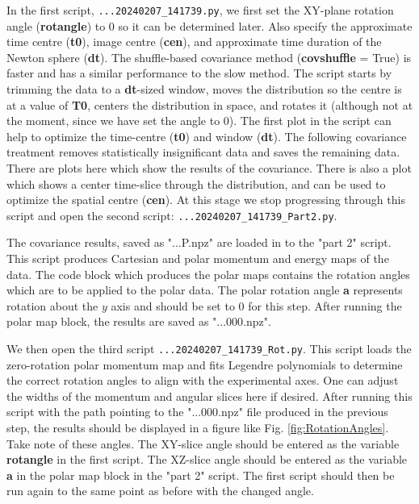 \documentclass[12pt]{article}
\begin{document}
In the first script, \texttt{...20240207\_141739.py}, we first set the XY-plane rotation angle (\textbf{rotangle}) to 0 so it can be determined later.
Also specify the approximate time centre (\textbf{t0}), image centre (\textbf{cen}), and approximate time duration of the Newton sphere (\textbf{dt}).
The shuffle-based covariance method (\textbf{covshuffle} = True) is faster and has a similar performance to the slow method.
The script starts by trimming the data to a \textbf{dt}-sized window, moves the distribution so the centre is at a value of \textbf{T0}, centers the distribution in space, and rotates it (although not at the moment, since we have set the angle to 0).
The first plot in the script can help to optimize the time-centre (\textbf{t0}) and window (\textbf{dt}).
The following covariance treatment removes statistically insignificant data and saves the remaining data.
There are plots here which show the results of the covariance.
There is also a plot which shows a center time-slice through the distribution, and can be used to optimize the spatial centre (\textbf{cen}).
At this stage we stop progressing through this script and open the second script: \texttt{...20240207\_141739\_Part2.py}.

The covariance results, saved as "...P.npz" are loaded in to the "part 2" script.
This script produces Cartesian and polar momentum and energy maps of the data.
The code block which produces the polar maps contains the rotation angles which are to be applied to the polar data.
The polar rotation angle \textbf{a} represents rotation about the $y$ axis and should be set to 0 for this step.
After running the polar map block, the results are saved as "...000.npz".

We then open the third script \texttt{...20240207\_141739\_Rot.py}.
This script loads the zero-rotation polar momentum map and fits Legendre polynomials to determine the correct rotation angles to align with the experimental axes.
One can adjust the widths of the momentum and angular slices here if desired.
After running this script with the path pointing to the "...000.npz" file produced in the previous step, the results should be displayed in a figure like Fig. \ref{fig:RotationAngles}.
Take note of these angles.
The XY-slice angle should be entered as the variable \textbf{rotangle} in the first script.
The XZ-slice angle should be entered as the variable \textbf{a} in the polar map block in the "part 2" script.
The first script should then be run again to the same point as before with the changed angle.
\end{document}
